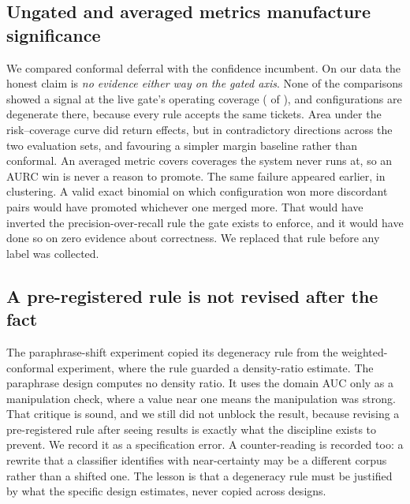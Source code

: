 \documentclass[conference,onecolumn,a4paper]{IEEEtran}
\begin{document}
\subsection{Ungated and averaged metrics manufacture significance}
We compared conformal deferral with the confidence incumbent. On our data the honest claim is \emph{no evidence either way on the gated axis}. None of the  comparisons showed a signal at the live gate's operating coverage ( of ), and  configurations are degenerate there, because every rule accepts the same tickets. Area under the risk--coverage curve did return effects, but in contradictory directions across the two evaluation sets, and favouring a simpler margin baseline rather than conformal. An averaged metric covers coverages the system never runs at, so an AURC win is never a reason to promote. The same failure appeared earlier, in clustering. A valid exact binomial on which configuration won more discordant pairs would have promoted whichever one merged more. That would have inverted the precision-over-recall rule the gate exists to enforce, and it would have done so on zero evidence about correctness. We replaced that rule before any label was collected.

\subsection{A pre-registered rule is not revised after the fact}
The paraphrase-shift experiment copied its degeneracy rule from the weighted-conformal experiment, where the rule guarded a density-ratio estimate. The paraphrase design computes no density ratio. It uses the domain AUC only as a manipulation check, where a value near one means the manipulation was strong. That critique is sound, and we still did not unblock the result, because revising a pre-registered rule after seeing results is exactly what the discipline exists to prevent. We record it as a specification error. A counter-reading is recorded too: a rewrite that a classifier identifies with near-certainty may be a different corpus rather than a shifted one. The lesson is that a degeneracy rule must be justified by what the specific design estimates, never copied across designs.
\end{document}
